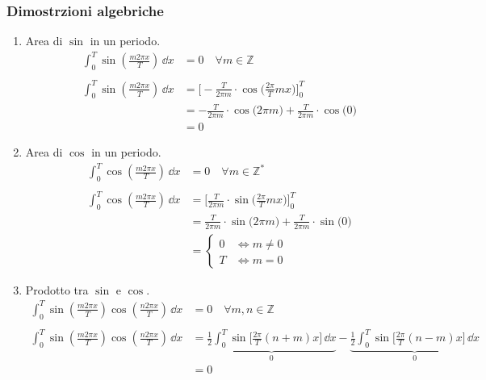 \subsubsection{Dimostrzioni algebriche}
\begin{enumerate}
\item {
    Area di \(\sin\) in un periodo.
    \begin{align*}
        \int_0^T \sin(\frac{m2\pi x}{T})\,\dd{x} &= 0
        \quad \forall m \in \mathbb{Z} \\
        \\
        \int_0^T \sin(\frac{m2\pi x}{T})\,\dd{x}
        &= \bigg [-\frac{T}{2\pi m }\cdot\cos\big(\frac{2\pi}{T}mx\big)\bigg]^T_0 \\
        &= -\frac{T}{2\pi m}\cdot\cos\big(2\pi m\big) 
            +\frac{T}{2\pi m}\cdot\cos\big(0\big) \\
        &= 0
    \end{align*}
}

\item {
    Area di \(\cos\) in un periodo.
    \begin{align*}
        \int_0^T \cos(\frac{m2\pi x}{T})\,\dd{x} &= 0
        \quad \forall m \in \mathbb{Z}^* \\
        \\
        \int_0^T \cos(\frac{m2\pi x}{T})\,\dd{x}
        &= \bigg [\frac{T}{2\pi m}\cdot\sin\big(\frac{2\pi}{T}mx\big)\bigg]^T_0 \\
        &= \frac{T}{2\pi m}\cdot\sin\big(2\pi m\big) 
            +\frac{T}{2\pi m}\cdot\sin\big(0\big) \\
        &= \begin{cases}
            0 & \iff m \neq 0 \\
            T & \iff m = 0 
        \end{cases}
    \end{align*}
}

\item {
    Prodotto tra \(\sin\) e \(\cos\).
    \begin{align*}
        \int_0^T \sin(\frac{m2\pi x}{T})\cos(\frac{n2\pi x}{T})\,\dd{x} &= 0
        \quad \forall m,n \in \mathbb{Z} \\
        \\
        \int_0^T \sin(\frac{m2\pi x}{T})\cos(\frac{n2\pi x}{T})\,\dd{x} &=
        \underbrace{\frac{1}{2}\int_0^T\sin\bigg[\frac{2\pi}{T}(n+m)x\bigg]\,\dd{x}}_{0} - 
        \underbrace{\frac{1}{2}\int_0^T\sin\bigg[\frac{2\pi}{T}(n-m)x\bigg]\,\dd{x}}_{0} \\
        &= 0 \\
    \end{align*}
}


\end{enumerate}
